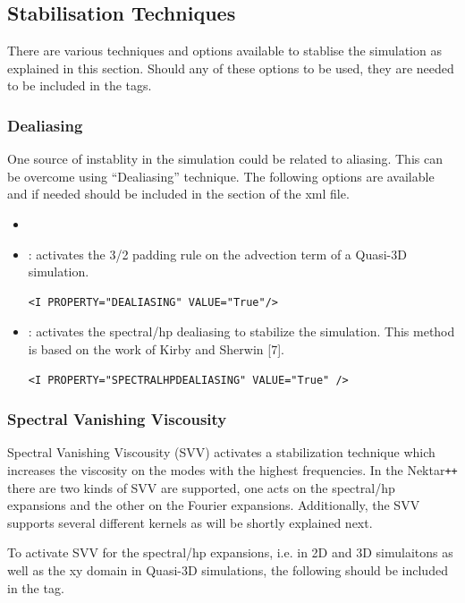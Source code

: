 \subsection{Stabilisation Techniques}
There are various techniques and options available to stablise the simulation as
explained in this section. Should any of these options to be used, they are 
needed to be included in the  tags.
\subsubsection{Dealiasing}
One source of instablity in the simulation could be related to aliasing. This can
be overcome using ``Dealiasing'' technique. The following options are available
and if needed should be included in the  section of the xml file.
\begin{itemize}
\item {} 
\item {}: activates the 3/2 padding
rule on the advection term of a Quasi-3D simulation.
\begin{lstlisting}[style=XMLStyle]
<I PROPERTY="DEALIASING" VALUE="True"/>
\end{lstlisting}

\item {}: activates the spectral/hp dealiasing to
stabilize the simulation. This method is based on the work of Kirby and Sherwin [7].
\begin{lstlisting}[style=XMLStyle]
<I PROPERTY="SPECTRALHPDEALIASING" VALUE="True" />
\end{lstlisting}
\end{itemize}

\subsubsection{Spectral Vanishing Viscousity}
Spectral Vanishing Viscousity (SVV) activates a stabilization technique
which increases the viscosity on the modes with the highest frequencies. In the
Nektar\texttt{++} there are two kinds of SVV are supported, one acts on the 
spectral/hp expansions and the other on the Fourier expansions. Additionally, the
SVV supports several different kernels as will be shortly explained next.



To activate SVV for the spectral/hp expansions, i.e. in 2D and 3D simulaitons 
as well as the xy domain in Quasi-3D simulations, the following should be 
included in the  tag.

